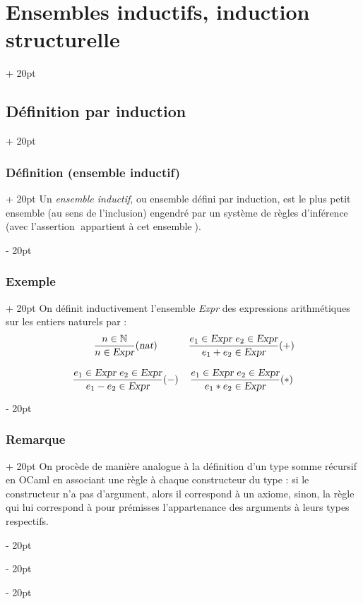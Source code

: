 \documentclass[a4paper, 12pt, twoside]{article}
\newcommand{\N}{\mathbb{N}} %
\newcommand{\simplecit}[1]{\guillemotleft$\;$#1$\;$\guillemotright}
\newcommand{\ind}[1][20pt]{\advance\leftskip + #1}
\newcommand{\deind}[1][20pt]{\advance\leftskip - #1}
\newenvironment{indt}[2][20pt]{#2 \par \ind[#1]}{\par \deind} %
\begin{document}
\begin{indt}{\section{Ensembles inductifs, induction structurelle}}
\begin{indt}{\subsection{Définition par induction}}
            \vspace{12pt}
            
            \begin{indt}{\subsubsection{Définition (ensemble inductif)}}
                Un \textit{ensemble inductif}, ou ensemble défini par induction, est le plus petit ensemble (au sens de l'inclusion) engendré par un système de règles d'inférence (avec l'assertion \simplecit{appartient à cet ensemble}).
            \end{indt}
            
            \vspace{12pt}
            
            \begin{indt}{\subsubsection{Exemple}}
                On définit inductivement l'ensemble \textsl{Expr} des expressions arithmétiques sur les entiers naturels par :
                    \[ \begin{array}{cc}
                        \dfrac{n \in \N}{n \in \text{\sl Expr}} (\text{\sl nat})
                        & \dfrac{e_1 \in \text{\sl Expr}\ e_2 \in \text{\sl Expr}}{e_1 + e_2 \in \text{\sl Expr}} (+)
                        \\\\
                        \dfrac{e_1 \in \text{\sl Expr}\ e_2 \in \text{\sl Expr}}{e_1 - e_2 \in \text{\sl Expr}} (-)
                        & \dfrac{e_1 \in \text{\sl Expr}\ e_2 \in \text{\sl Expr}}{e_1 * e_2 \in \text{\sl Expr}} (*)
                    \end{array} \]
            \end{indt}
            
            \vspace{12pt}
            
            \begin{indt}{\subsubsection{Remarque}}
                On procède de manière analogue à la définition d'un type somme récursif en OCaml en associant une règle à chaque constructeur du type : si le constructeur n'a pas d'argument, alors il correspond à un axiome, sinon, la règle qui lui correspond à pour prémisses l'appartenance des arguments à leurs types respectifs.
                

\end{indt}
\end{indt}
\end{indt}
\end{document}
